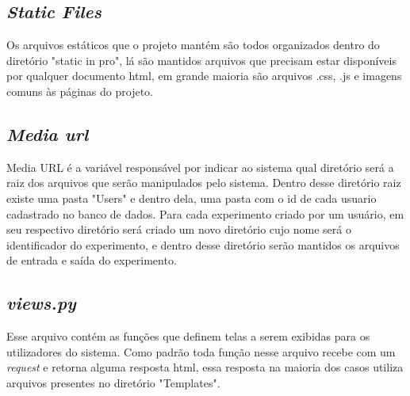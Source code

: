 \documentclass[tg]{mdtufsm}
\begin{document}
\subsection{\emph{Static Files}}
Os arquivos estáticos que o projeto mantém são todos organizados dentro do diretório "static in pro", lá são mantidos arquivos que precisam estar disponíveis por qualquer documento html, em grande maioria são arquivos .css, .js e imagens comuns às páginas do projeto.
\subsection{\emph{Media url}}
Media URL é a variável responsável por indicar ao sistema qual diretório será a raiz dos arquivos que serão manipulados pelo sistema. Dentro desse diretório raiz existe uma pasta "Users" e dentro dela, uma pasta com o id de cada usuario cadastrado no banco de dados. Para cada experimento criado por um usuário, em seu respectivo diretório será criado um novo diretório cujo nome será o identificador do experimento, e dentro desse diretório serão mantidos os arquivos de entrada e saída do experimento.
\subsection{\emph{views.py}}
Esse arquivo contém as funções que definem telas a serem exibidas para os utilizadores do sistema. Como padrão toda função nesse arquivo recebe com um \emph{request} e retorna alguma resposta html, essa resposta na maioria dos casos utiliza arquivos presentes no diretório "Templates".
\end{document}
